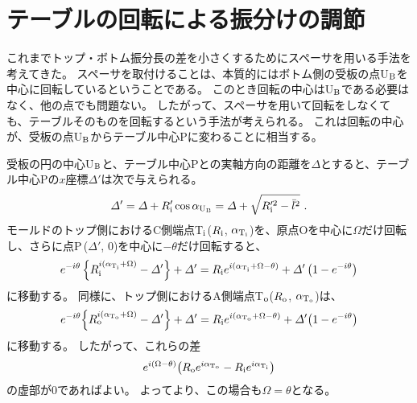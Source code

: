 \clearpage
\section{テーブルの回転による振分けの調節}
これまでトップ・ボトム振分長の差を小さくするためにスペーサを用いる手法を考えてきた。
スペーサを取付けることは、本質的にはボトム側の受板の点U$_\text B$を中心に回転しているということである。
このとき回転の中心はU$_\text B$である必要はなく、他の点でも問題ない。
したがって、スペーサを用いて回転をしなくても、テーブルそのものを回転するという手法が考えられる。
これは回転の中心が、受板の点U$_\text B$からテーブル中心Pに変わることに相当する。

受板の円の中心U$_\text B$と、テーブル中心Pとの実軸方向の距離を$\varDelta$とすると、テーブル中心Pの$x$座標$\varDelta'$は次で与えられる。
\begin{align}
  \label{eq:tableCenter}
  \varDelta' = \varDelta+R_\text i'\cos\alpha_{\text U_\text B} = \varDelta+\sqrt{R_\text i'^2-\bar l^2}\ .
\end{align}
モールドのトップ側におけるC側端点T$_\text i$($R_\text i$, $\alpha_{\text T_\text i}$)を、原点Oを中心に$\Omega$だけ回転し、さらに点P\,($\varDelta'$, $0$)を中心に$-\theta$だけ回転すると、
\begin{align}
  \label{eq:afterfttable}
  e^{-i\theta}\left\{R_\text i^{i(\alpha_{\text T_\text i}+\Omega)}-\varDelta'\right\}+\varDelta'
  = R_\text ie^{i(\alpha_{\text T_\text i}+\Omega-\theta)}+\varDelta'\left(1-e^{-i\theta}\right)
\end{align}
に移動する。
同様に、トップ側におけるA側端点T$_\text o$($R_\text o$, $\alpha_{\text T_\text o}$)は、
\begin{align*}
  e^{-i\theta}\!\left\{R_\text o^{i(\alpha_{\text T_\text o}+\Omega)}-\varDelta'\right\}+\varDelta'
  = R_\text ie^{i(\alpha_{\text T_\text o}+\Omega-\theta)}+\varDelta'\!\left(1-e^{-i\theta}\right)
\end{align*}
に移動する。
したがって、これらの差
\begin{align*}
  e^{i(\Omega-\theta)}\!\left(R_\text oe^{i\alpha_{\text T_\text o}}-R_\text ie^{i\alpha_{\text T_\text i}}\right)
\end{align*}
の虚部が$0$であればよい。
よってより、この場合も$\Omega = \theta$となる。



